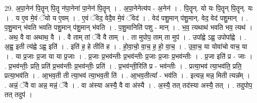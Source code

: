 \documentclass[17pt]{extarticle}
\begin{document}
29. अ॒पा॒नेन॑ पि॒तॄन् पि॒तॄ न॑पा॒नेना॑ पा॒नेन॑ पि॒तॄन् । . अ॒पा॒नेनेत्य॑प - अ॒नेन॑ । . पि॒तॄन्. यो यः पि॒तॄन् पि॒तॄन्. यः । . य ए॒व मे॒वं ॅयो य ए॒वम् । . ए॒वं ॅवेद॒ वेदै॒व मे॒वं ॅवेद॑ । . वेद॑ पशु॒मान् प॑शु॒मान्. वेद॒ वेद॑ पशु॒मान् । . प॒शु॒मान् भ॑वति भवति पशु॒मान् प॑शु॒मान् भ॑वति । . प॒शु॒मानिति॑ पशु - मान् । . भ॒व॒ त्यथाथ॑ भवति भव॒ त्यथ॑ । . अथ॒ वै वा अथाथ॒ वै । . वै ताम् तां ॅवै वै ताम् । . ता मुपोप॒ ताम् ता मुप॑ । . उपा᳚ह्वे ऽह्व॒ उपोपा᳚ह्वे । . अ॒ह्व॒ इती त्य॑ह्वे ऽह्व॒ इति॑ । . इति॑ ह॒ हे तीति॑ ह । . हो॒वा॒चो॒ वा॒च॒ ह॒ हो॒ वा॒च॒ । . उ॒वा॒च॒ या योवा॑चो वाच॒ या । . या प्र॒जाः प्र॒जा या या प्र॒जाः । . प्र॒जाः प्र॒भव॑न्तीः प्र॒भव॑न्तीः प्र॒जाः प्र॒जाः प्र॒भव॑न्तीः । . प्र॒जा इति॑ प्र - जाः । . प्र॒भव॑न्तीः॒ प्रति॒ प्रति॑ प्र॒भव॑न्तीः प्र॒भव॑न्तीः॒ प्रति॑ । . प्र॒भव॑न्ती॒रिति॑ प्र - भव॑न्तीः । . प्रत्या॒भव॑ त्या॒भव॑ति॒ प्रति॒ प्रत्या॒भव॑ति । . आ॒भव॒ती ती त्या॒भव॑ त्या॒भव॒ती ति॑ । . आ॒भव॒तीत्या᳚ - भव॑ति । . इत्यन्न॒ मन्न॒ मिती त्यन्न᳚म् । . अन्नं॒ ॅवै वा अन्न॒ मन्नं॒ ॅवै । . वा अ॑स्या अस्यै॒ वै वा अ॑स्यै । . अ॒स्यै॒ तत् तद॑स्या अस्यै॒ तत् । . तदुपोप॒ तत् तदुप॑ । \newline
\end{document}
